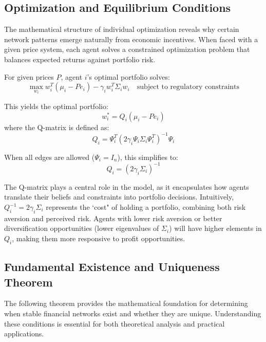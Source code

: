 \subsection{Optimization and Equilibrium Conditions}

The mathematical structure of individual optimization reveals why certain network patterns emerge naturally from economic incentives. When faced with a given price system, each agent solves a constrained optimization problem that balances expected returns against portfolio risk.

For given prices $P$, agent $i$'s optimal portfolio solves:
\begin{equation}
\max_{w_i} w_i^T(\mu_i - Pe_i) - \gamma_i w_i^T\Sigma_i w_i \quad \text{subject to regulatory constraints}
\end{equation}

This yields the optimal portfolio:
\begin{equation}
w_i^* = Q_i(\mu_i - Pe_i)
\label{eq:original_optimal_portfolio}
\end{equation}
where the Q-matrix is defined as:
\begin{equation}
Q_i = \Psi_i^T(2\gamma_i\Psi_i\Sigma_i\Psi_i^T)^{-1}\Psi_i
\label{eq:original_Q_matrix}
\end{equation}

When all edges are allowed ($\Psi_i = I_n$), this simplifies to:
\begin{equation}
Q_i = (2\gamma_i\Sigma_i)^{-1}
\label{eq:original_Q_simplified}
\end{equation}

The Q-matrix plays a central role in the model, as it encapsulates how agents translate their beliefs and constraints into portfolio decisions. Intuitively, $Q_i^{-1} = 2\gamma_i\Sigma_i$ represents the `cost" of holding a portfolio, combining both risk aversion and perceived risk. Agents with lower risk aversion or better diversification opportunities (lower eigenvalues of $\Sigma_i$) will have higher elements in $Q_i$, making them more responsive to profit opportunities.

\subsection{Fundamental Existence and Uniqueness Theorem}

The following theorem provides the mathematical foundation for determining when stable financial networks exist and whether they are unique. Understanding these conditions is essential for both theoretical analysis and practical applications.

